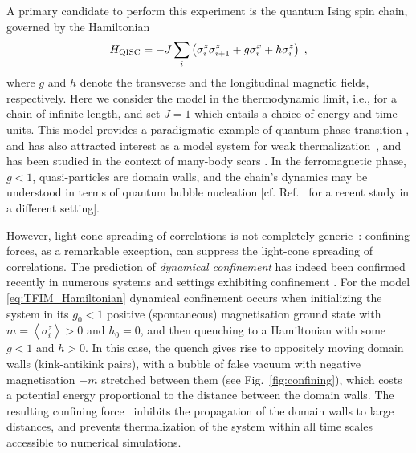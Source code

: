 \documentclass[amsmath,amssymb,11pt]{article}
\numberwithin{equation}{section}
\numberwithin{figure}{section}
\numberwithin{table}{section}
\begin{document}
A primary candidate to perform this experiment is the quantum Ising spin chain, governed by the Hamiltonian
\begin{eqnarray}
H_{\rm QISC}=-J\sum_{i}\left(\sigma_{i}^{z}\sigma_{i+1}^{z}+g\sigma_{i}^{x}+h\sigma_{i}^{z}\right)\;,
\label{eq:TFIM_Hamiltonian}\end{eqnarray}
where $g$ and $h$ denote the transverse and the longitudinal magnetic fields, respectively. {Here we consider the model in the thermodynamic limit, i.e., for a chain of infinite length, and set $J=1$ which entails a choice of energy and time units.}  This model provides a paradigmatic example of quantum phase transition \cite{sachdev_2011,dutta_aeppli_chakrabarti_divakaran_rosenbaum_sen_2015}, and has also attracted interest as a model system for weak thermalization~\cite{2011PhRvL.106e0405B,2017PhRvA..95b3621L}, and has been studied in the context of many-body scars \cite{2020PhRvX..10a1055M}. In the ferromagnetic phase, $g<1$, quasi-particles are domain walls, and the chain's dynamics may be understood in terms of quantum bubble nucleation [cf. Ref.~\cite{2021arXiv210304762S} for a recent study in a different setting]. 

However, light-cone spreading of correlations is not completely generic~\cite{2017NatPh..13..246K}: confining forces, as a remarkable exception, can suppress the light-cone spreading of correlations. The prediction of \emph{dynamical confinement} has indeed been confirmed recently in numerous systems and settings exhibiting confinement \cite{2019arXiv190904821M,2019arXiv191211117T,2019PhRvB..99r0302M,2019PhRvB..99s5108R,2019PhRvL.122m0603J,2019PhRvL.122o0601L,2020PhRvB.102d1118L,2020PhRvL.124r0602C,2020PhRvL.124t7602Y}. For the model \eqref{eq:TFIM_Hamiltonian} dynamical confinement occurs when initializing the system in its $g_0<1$ positive (spontaneous) magnetisation ground state with $m=\left\langle \sigma_{i}^{z}\right\rangle >0$ and $h_0=0$, and then 
quenching to a Hamiltonian with some  $g<1$ and  $h>0$.  In this case, the quench gives rise to oppositely moving domain walls (kink-antikink pairs), with a bubble of false vacuum with negative magnetisation $-m$ stretched between them (see Fig.~\ref{fig:confining}), which costs a potential energy  proportional to the distance between the domain walls.  The resulting confining force~\cite{1978PhRvD..18.1259M} inhibits the propagation of the domain walls  to large distances, and prevents thermalization of the system within
all time scales accessible to numerical simulations.
\end{document}
